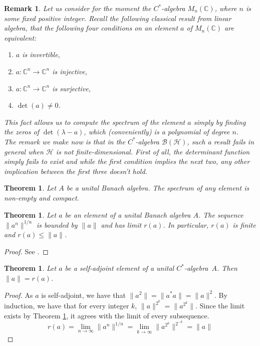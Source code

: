 \documentclass{book}
\newtheorem{remark}[definition]{Remark}
\newtheorem{theorem}[definition]{Theorem}
\def\cstar{\(C^*\)-algebra}
\begin{document}
\begin{remark}
  Let us consider for the moment the \(C^*\)-algebra \(M_n(\mathbb{C})\), where
  \(n\) is some fixed positive integer. Recall the following classical result from linear algebra,
  that the following four conditions on an element \(a\) of \(M_n(\mathbb{C})\) are equivalent:
  \begin{enumerate}
    \item \(a\) is invertible,
    \item \(a: \mathbb{C}^n\rightarrow\mathbb{C}^n\) is injective,
    \item \(a: \mathbb{C}^n\rightarrow\mathbb{C}^n\) is surjective,
    \item \(\det(a)\neq 0\).
  \end{enumerate}
  This fact allows us to compute the spectrum of the element \(a\) simply by finding
  the zeros of \(\det(\lambda-a)\), which (conveniently) is a polynomial of degree \(n\).\\
  The remark we make now is that in the \(C^*\)-algebra \(\mathcal{B}(\mathcal{H})\), such a result fails
  in general when \(\mathcal{H}\) is not finite-dimensional. First of all, the determinant
  function simply fails to exist and while the first condition implies the next
  two, any other implication between the first three doesn't hold.
\end{remark}
\begin{theorem}\label{theorem:134}
  Let \(A\) be a unital Banach algebra. The spectrum of any element is non-empty and compact.
\end{theorem}
\begin{theorem}\label{theorem:135}
  Let \(a\) be an element of a unital Banach algebra \(A\). The sequence \(\|a^n\|^{1/n}\)
  is bounded by \(\|a\|\) and has limit \(r(a)\). In particular,
  \(r(a)\) is finite and \(r(a) \leq \|a\|\).
\end{theorem}
\begin{proof}
  See \cite[Theorem 1.2.7]{MGJ90}.
\end{proof}
\begin{theorem}\label{theorem:136}
   Let \(a\) be a self-adjoint element of a unital \cstar\ \(A\). Then \(\|a\| =r(a)\).
\end{theorem}
\begin{proof}
  As \(a\) is self-adjoint, we have that \(\|a^2\|=\|a^*a\|=\|a\|^2\). 
  By induction, we have that for every integer \(k\), \(\|a\|^{2^k}=\|a^{2^k}\|\). 
  Since the limit exists by Theorem \ref{theorem:135}, it agrees with the limit of every subsequence.
  \[
    r(a)=\lim_{n\rightarrow\infty}\|a^n\|^{1/n}=\lim_{k\rightarrow\infty}\|a^{2^k}\|^{2^{-k}}=\|a\|
  \]
\end{proof}
\end{document}
